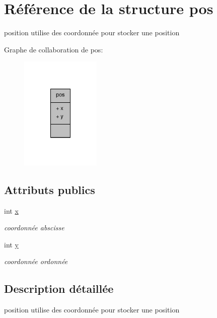 \hypertarget{structpos}{\section{Référence de la structure pos}
\label{structpos}
}


position utilise des coordonnée pour stocker une position  




Graphe de collaboration de pos\-:
\nopagebreak
\begin{figure}[H]
\begin{center}
\leavevmode
\includegraphics[width=108pt]{structpos__coll__graph}
\end{center}
\end{figure}
\subsection*{Attributs publics}
\begin{DoxyCompactItemize}
\item 
\hypertarget{structpos_aac09c213542d5ffc796972c3c10e4d1c}{int \hyperlink{structpos_aac09c213542d5ffc796972c3c10e4d1c}{x}}\label{structpos_aac09c213542d5ffc796972c3c10e4d1c}

\begin{DoxyCompactList}\small\item\em coordonnée abscisse \end{DoxyCompactList}\item 
\hypertarget{structpos_a8507e8245423d67f3bb29e2fa0f08054}{int \hyperlink{structpos_a8507e8245423d67f3bb29e2fa0f08054}{y}}\label{structpos_a8507e8245423d67f3bb29e2fa0f08054}

\begin{DoxyCompactList}\small\item\em coordonnée ordonnée \end{DoxyCompactList}\end{DoxyCompactItemize}


\subsection{Description détaillée}
position utilise des coordonnée pour stocker une position 